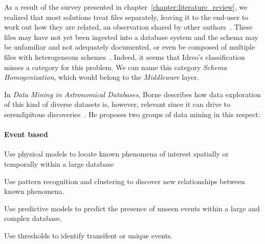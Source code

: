 As a result of the survey presented in chapter~\ref{chapter:literature_review},
we realized that most solutions treat files
separately, leaving it to the end-user to work out how they are related,
an observation shared by other authors~\cite{Silva2016}.
These files may have not yet been ingested into a database system and 
the schema may be unfamiliar and not adequately documented, or even be
composed of multiple files with heterogeneous schemes~\cite{alawini2016,zhang2015astronomy}.
Indeed, it seems that Idreo's classification misses a category for this problem.
We can name this category \emph{Schema Homogenization}, which would belong to the \emph{Middleware} layer.



In \emph{Data Mining in Astronomical Databases}, Borne
describes how data exploration of this kind of diverse datasets is, however,
relevant since it can drive to serendipitous discoveries~\cite{Borne2001}. He proposes
two groups of data mining in this respect:

\paragraph{Event based}

\begin{description}[leftmargin=1cm, labelindent=0.5cm]
  \item[Known events / known algorithms]
    Use physical models to locate known phenomena of interest spatially
    or temporally within a large database
  \item[Known events / unknown algorithms]
    Use pattern recognition and clustering to discover new relationships between known
    phenomena.
  \item[Unknown events / known algorithms]
    Use predictive models to predict the presence of unseen events within a
    large and complex database.
  \item[Unknown events / unknown algorithms]
    Use thresholds to identify transifent or unique events.
\end{description}


